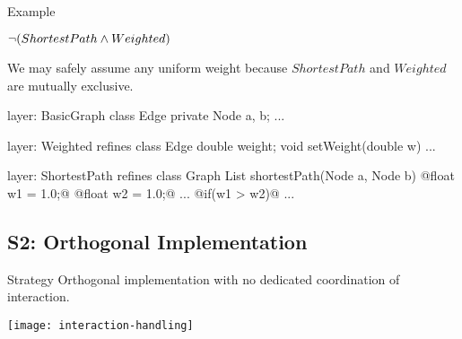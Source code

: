 \begin{frame}[fragile]{Example}
	\begin{mycolumns}[widths={50,50},animation=none]
		\begin{exampletight}{}
			\centering

			$\neg (ShortestPath \wedge Weighted)$  
		\end{exampletight}
		\vspace{3mm}
		\begin{note}{}
			We may safely assume any uniform weight because $ShortestPath$ and $Weighted$ are mutually exclusive.
		\end{note}
	\mynextcolumn
\vspace{-3mm}
{\small
\begin{codetight}{layer: BasicGraph}
class Edge {
	private Node a, b;
	...
}
\end{codetight}	
\begin{codetight}{layer: Weighted}
refines class Edge {
	double weight;
	void setWeight(double w){ ... }
}
\end{codetight}	
\begin{codetight}{layer: ShortestPath}
refines class Graph {
	List shortestPath(Node a, Node b){
		@float w1 = 1.0;@
		@float w2 = 1.0;@
		...
		@if(w1 > w2)@
		... 
	}
}
\end{codetight}	
}
	\end{mycolumns}
\end{frame}

\subsection{S2: Orthogonal Implementation}

\begin{frame}{\myframetitle}
	\begin{definition}{Strategy}
		Orthogonal implementation with no dedicated coordination of interaction.
	\end{definition}
	\begin{notetight}{}
		\centering\texttt{[image: interaction-handling]}
	\end{notetight}
\end{frame}

